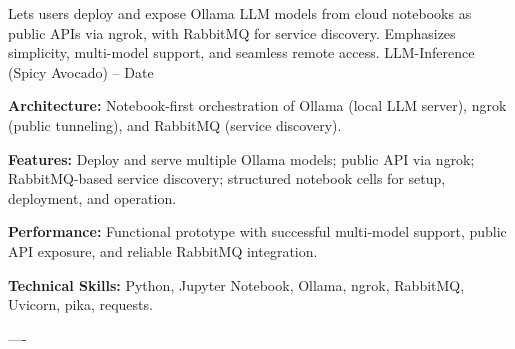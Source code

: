 \begin{cventries}


\cventry
    {Lets users deploy and expose Ollama LLM models from cloud notebooks
    as public APIs via ngrok, with RabbitMQ for service discovery.
    Emphasizes simplicity, multi-model support, and seamless remote access.}
    {LLM-Inference (Spicy Avocado)}
    {--}
    {Date}
    {
      \begin{cvitems}
        \item \textbf{Architecture:}{ Notebook-first orchestration of Ollama (local LLM server), ngrok (public tunneling), and RabbitMQ (service discovery).}
        \item \textbf{Features:}{ Deploy and serve multiple Ollama models; public API via ngrok; RabbitMQ-based service discovery; structured notebook cells for setup, deployment, and operation.}
        \item \textbf{Performance:}{ Functional prototype with successful multi-model support, public API exposure, and reliable RabbitMQ integration.}
        \item \textbf{Technical Skills:}{ Python, Jupyter Notebook, Ollama, ngrok, RabbitMQ, Uvicorn, pika, requests.}
      \end{cvitems}
    }
    \begin{singlespace}
----
\end{singlespace}




\end{cventries}
